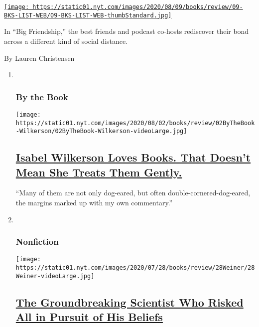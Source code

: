 \begin{enumerate}
\begin{enumerate}
    \href{/2020/07/30/books/review/aminatou-sow-ann-friedman-big-friendship.html}{\texttt{[image: https://static01.nyt.com/images/2020/08/09/books/review/09-BKS-LIST-WEB/09-BKS-LIST-WEB-thumbStandard.jpg]}}

    In ``Big Friendship,'' the best friends and podcast co-hosts
    rediscover their bond across a different kind of social distance.

    By Lauren Christensen
  \end{enumerate}
\end{enumerate}

\begin{enumerate}
\def\labelenumi{\arabic{enumi}.}
\item ~
  \hypertarget{by-the-book}{%
  \subsubsection{By the Book}\label{by-the-book}}

  \texttt{[image: https://static01.nyt.com/images/2020/08/02/books/review/02ByTheBook-Wilkerson/02ByTheBook-Wilkerson-videoLarge.jpg]}

  \hypertarget{isabel-wilkerson-loves-books-that-doesnt-mean-she-treats-them-gently}{%
  \subsection{\texorpdfstring{\href{/2020/07/30/books/review/isabel-wilkerson-by-the-book-interview.html}{Isabel
  Wilkerson Loves Books. That Doesn't Mean She Treats Them
  Gently.}}{Isabel Wilkerson Loves Books. That Doesn't Mean She Treats Them Gently.}}\label{isabel-wilkerson-loves-books-that-doesnt-mean-she-treats-them-gently}}

  ``Many of them are not only dog-eared, but often
  double-cornered-dog-eared, the margins marked up with my own
  commentary.''
\item ~
  \hypertarget{nonfiction-2}{%
  \subsubsection{Nonfiction}\label{nonfiction-2}}

  \texttt{[image: https://static01.nyt.com/images/2020/07/28/books/review/28Weiner/28Weiner-videoLarge.jpg]}

  \hypertarget{the-groundbreaking-scientist-who-risked-all-in-pursuit-of-his-beliefs}{%
  \subsection{\texorpdfstring{\href{/2020/07/28/books/review/a-dominant-character-haldane-samanth-subramanian.html}{The
  Groundbreaking Scientist Who Risked All in Pursuit of His
  Beliefs}}{The Groundbreaking Scientist Who Risked All in Pursuit of His Beliefs}}\label{the-groundbreaking-scientist-who-risked-all-in-pursuit-of-his-beliefs}}


\end{enumerate}
